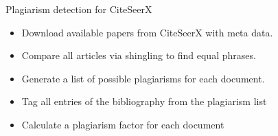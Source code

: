 \begin{frame}[c]
{Plagiarism detection for CiteSeerX}
\begin{itemize}
  \begin{itemize}
  \item Download available papers from CiteSeerX with meta data.
  \item Compare all articles via shingling to find equal phrases.
  \item Generate a list of possible plagiarisms for each document.
  \item Tag all entries of the bibliography from the plagiarism list
  \item Calculate a plagiarism factor for each document
\end{itemize} 
\end{itemize}
\end{frame}